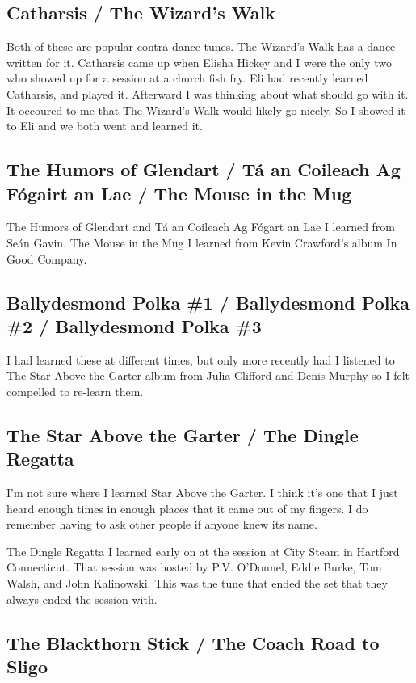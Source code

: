 \documentclass[11pt,letterpaper]{article}
\begin{document}
\subsection{Catharsis / The Wizard's Walk}

Both of these are popular contra dance tunes. The Wizard's Walk has a dance written for it. Catharsis came up when Elisha Hickey and I were the only two who showed up for a session at a church fish fry. Eli had recently learned Catharsis, and played it. Afterward I was thinking about what should go with it. It occoured to me that The Wizard's Walk would likely go nicely. So I showed it to Eli and we both went and learned it. 

\subsection{The Humors of Glendart / T\'a an Coileach Ag F\'ogairt an Lae / The Mouse in the Mug}

The Humors of Glendart and T\'a an Coileach Ag F\'ogart an Lae I learned from Se\'an Gavin. The Mouse in the Mug I learned from Kevin Crawford's album In Good Company. 

\subsection{Ballydesmond Polka \#1 / Ballydesmond Polka \#2 / Ballydesmond Polka \#3}

I had learned these at different times, but only more recently had I listened to The Star Above the Garter album from Julia Clifford and Denis Murphy so I felt compelled to re-learn them.

\subsection{The Star Above the Garter / The Dingle Regatta}

I'm not sure where I learned Star Above the Garter. I think it's one that I just heard enough times in enough places that it came out of my fingers. I do remember having to ask other people if anyone knew its name. 

The Dingle Regatta I learned early on at the session at City Steam in Hartford Connecticut. That session was hosted by P.V. O'Donnel, Eddie Burke, Tom Walsh, and John Kalinowski. This was the tune that ended the set that they always ended the session with.

\subsection{The Blackthorn Stick / The Coach Road to Sligo}
\end{document}
